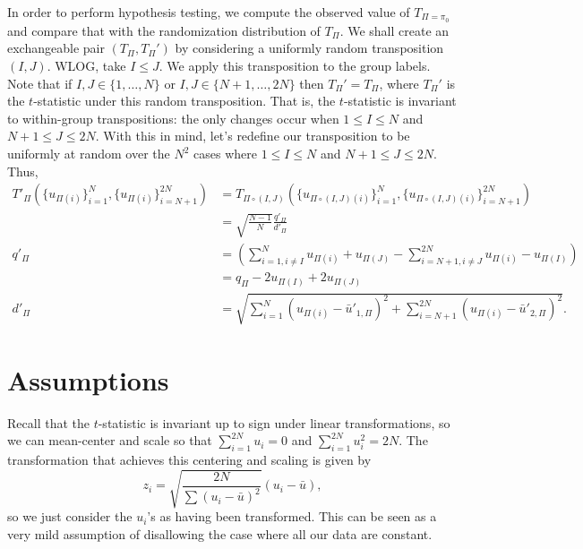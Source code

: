 In order to perform hypothesis testing, we compute the observed value of $T_{\Pi=\pi_0}$ and compare
that with the randomization distribution of $T_{\Pi}$.  We shall create an exchangeable pair
$(T_{\Pi}, T_{\Pi}')$ by considering a uniformly random transposition $(I, J)$.  WLOG, take $I \leq
J$.  We apply this transposition to the group labels.  Note that if $I, J \in \{1,\ldots,N\}$ or $I,
J \in \{N+1,\ldots,2N\}$ then $T_{\Pi}' = T_{\Pi}$, where $T_{\Pi}'$ is the $t$-statistic under this
random transposition.  That is, the $t$-statistic is invariant to within-group transpositions: the
only changes occur when $1 \leq I \leq N$ and $N + 1 \leq J \leq 2N$.  With this in mind, let's
redefine our transposition to be uniformly at random over the $N^2$ cases where $1 \leq I \leq N$
and $N + 1 \leq J \leq 2N$. Thus,
\begin{align*}
  T'_{\Pi}(\{u_{\Pi(i)}\}_{i=1}^N, \{u_{\Pi(i)}\}_{i=N+1}^{2N}) 
  &= T_{\Pi \circ (I,J)}(\{u_{\Pi \circ (I,J)(i)}\}_{i=1}^N, \{u_{\Pi \circ (I,J)(i)}\}_{i=N+1}^{2N}) \\
  &= \sqrt{\frac{N-1}{N}}\frac{q'_{\Pi}}{d'_{\Pi}} \\
  q'_{\Pi} &= \left (\sum_{i=1, i\neq I}^N u_{\Pi(i)} + u_{\Pi(J)} -
    \sum_{i=N+1, i\neq J}^{2N}u_{\Pi(i)} - u_{\Pi(I)} \right ) \\
  &= q_{\Pi} - 2u_{\Pi(I)} + 2u_{\Pi(J)} \\
  d'_{\Pi} &= \sqrt{\sum_{i=1}^N(u_{\Pi(i)} - \bar{u}'_{1, \Pi})^{2} +
    \sum_{i=N+1}^{2N}(u_{\Pi(i)} - \bar{u}'_{2, \Pi})^{2}}.  
\end{align*}

\section{Assumptions}
Recall that the $t$-statistic is invariant up to sign under linear transformations, so we can
mean-center and scale so that $\sum_{i=1}^{2N} u_{i} = 0$ and $\sum_{i=1}^{2N} u_{i}^2 = 2N$.  The
transformation that achieves this centering and scaling is given by
\begin{equation}
  z_i = \sqrt{\frac{2N}{\sum (u_{i} - \bar{u})^2}}(u_{i}-\bar{u}), 
\end{equation}
so we just consider the $u_{i}$'s as having been transformed.  This can be seen as a very mild
assumption of disallowing the case where all our data are constant.  

